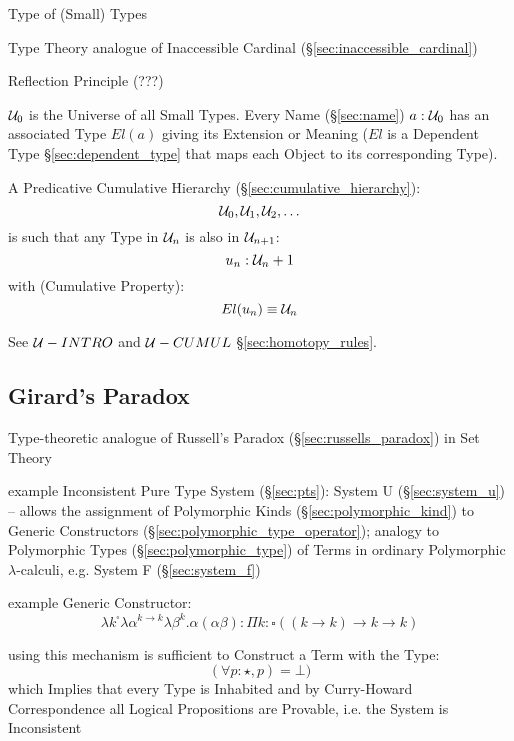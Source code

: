 Type of (Small) Types

Type Theory analogue of Inaccessible Cardinal
(\S\ref{sec:inaccessible_cardinal})

Reflection Principle (???)

$\mathcal{U}_0$ is the Universe of all Small Types. Every Name
(\S\ref{sec:name}) $a:\mathcal{U}_0$ has an associated Type $El(a)$
giving its Extension or Meaning ($El$ is a Dependent Type
\S\ref{sec:dependent_type} that maps each Object to its corresponding
Type).

A Predicative Cumulative Hierarchy (\S\ref{sec:cumulative_hierarchy}):
\[
  \mathcal{U}_0, \mathcal{U}_1, \mathcal{U}_2, \ldots
\]
is such that any Type in $\mathcal{U}_n$ is also in
$\mathcal{U}_{n+1}$:
\[
  u_n:\mathcal{U}_n+1
\]
with (Cumulative Property):
\[
  El(u_n) \equiv \mathcal{U}_n
\]

\fist See $\mathcal{U}-INTRO$ and $\mathcal{U}-CUMUL$
\S\ref{sec:homotopy_rules}.



\subsection{Girard's Paradox}\label{sec:girards_paradox}

Type-theoretic analogue of Russell's Paradox
(\S\ref{sec:russells_paradox}) in Set Theory

example Inconsistent Pure Type System (\S\ref{sec:pts}): System U
(\S\ref{sec:system_u}) -- allows the assignment of Polymorphic Kinds
(\S\ref{sec:polymorphic_kind}) to Generic Constructors
(\S\ref{sec:polymorphic_type_operator}); analogy to Polymorphic Types
(\S\ref{sec:polymorphic_type}) of Terms in ordinary Polymorphic
$\lambda$-calculi, e.g. System F (\S\ref{sec:system_f})

example Generic Constructor:
\[
  \lambda k^\square \lambda \alpha^{k \rightarrow k}\lambda\beta^k.
    \alpha(\alpha\beta) :
  \Pi k:\square((k \rightarrow k) \rightarrow k \rightarrow k)
\]

using this mechanism is sufficient to Construct a Term with the Type:
\[
  (\forall p:\star,p) = \bot)
\]
which Implies that every Type is Inhabited and by Curry-Howard
Correspondence all Logical Propositions are Provable, i.e. the System
is Inconsistent



